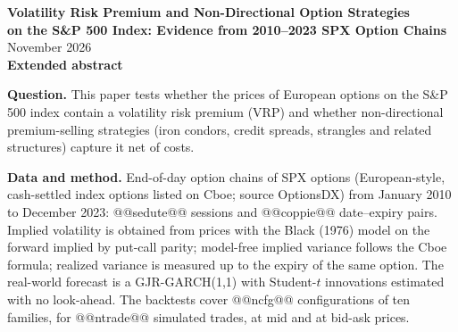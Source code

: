 \documentclass[11pt,a4paper]{article}
\begin{document}
\begin{center}
{\Large\bfseries Volatility Risk Premium and Non-Directional Option Strategies\\[2pt] on the S\&P 500 Index: Evidence from 2010--2023 SPX Option Chains}\\[6pt]
{\small November 2026}\\[4pt]
{\bfseries Extended abstract}
\end{center}
{\let\thefootnote\relax{}}

\textbf{Question.} This paper tests whether the prices of European options on the S\&P 500 index contain a volatility risk premium (VRP) and whether non-directional premium-selling strategies (iron condors, credit spreads, strangles and related structures) capture it net of costs.

\textbf{Data and method.} End-of-day option chains of SPX options (European-style, cash-settled index options listed on Cboe; source OptionsDX) from January 2010 to December 2023: @@sedute@@ sessions and @@coppie@@ date--expiry pairs. Implied volatility is obtained from prices with the Black (1976) model on the forward implied by put-call parity; model-free implied variance follows the Cboe formula; realized variance is measured up to the expiry of the same option. The real-world forecast is a GJR-GARCH(1,1) with Student-$t$ innovations estimated with no look-ahead. The backtests cover @@ncfg@@ configurations of ten families, for @@ntrade@@ simulated trades, at mid and at bid-ask prices.
\end{document}

